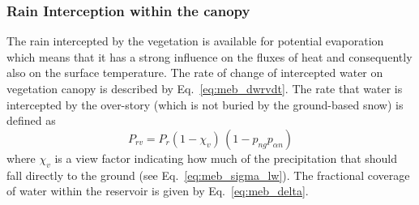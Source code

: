 \subsubsection{Rain Interception within the canopy}
\label{sec:meb_rain_interception}

The rain intercepted by the vegetation is available for potential
evaporation which means 
that it has a strong
influence on the fluxes of heat and consequently also on the surface
temperature.
%
%
The rate of change of intercepted water on vegetation canopy is
described by Eq.~\ref{eq:meb_dwrvdt}.
%
%
The rate that water is intercepted 
by the over-story (which is not buried by the ground-based snow) is defined as
%
\begin{equation}
\label{Prv_int}
P_{rv} = P_r \left(1-\chi_v\right) \, \left(1-p_{ng}p_{\alpha n}\right)
\end{equation}
%
where $\chi_v$ is a view factor indicating how much of the precipitation that
should fall directly to the ground (see Eq.~\ref{eq:meb_sigma_lw}).
%
The fractional coverage of water within the reservoir 
is given by Eq.~\ref{eq:meb_delta}.
%
%
%

